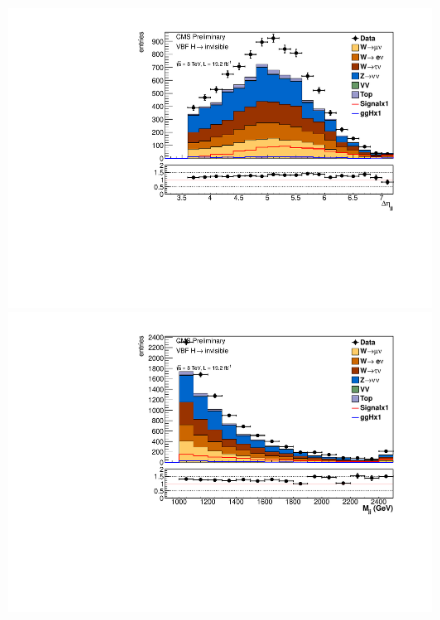 \begin{figure}
  \includegraphics[width=.6\largefigwidth]{plots/parked/AN-14-243-figs/output_presel/nunu_dijet_deta.pdf}
    \includegraphics[width=.6\largefigwidth]{plots/parked/AN-14-243-figs/output_presel/nunu_dijet_M.pdf}


\end{figure}
